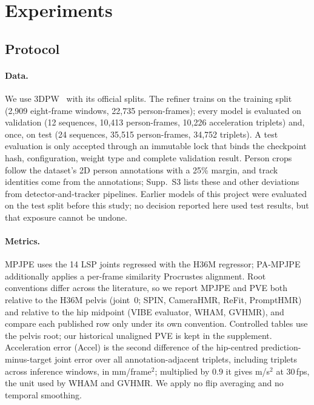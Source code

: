\section{Experiments}
\label{sec:experiments}

\subsection{Protocol}
\label{sec:protocol}

\paragraph{Data.}
We use 3DPW~\cite{vonmarcard2018pw3d} with its official splits.
The refiner trains on the training split (2,909 eight-frame windows, 22,735 person-frames); every model is evaluated on validation (12 sequences, 10,413 person-frames, 10,226 acceleration triplets) and, once, on test (24 sequences, 35,515 person-frames, 34,752 triplets).
A test evaluation is only accepted through an immutable lock that binds the checkpoint hash, configuration, weight type and complete validation result.
Person crops follow the dataset's 2D person annotations with a 25\% margin, and track identities come from the annotations; Supp.~S3 lists these and other deviations from detector-and-tracker pipelines.
Earlier models of this project were evaluated on the test split before this study; no decision reported here used test results, but that exposure cannot be undone.

\paragraph{Metrics.}
MPJPE uses the 14 LSP joints regressed with the H36M regressor; PA-MPJPE additionally applies a per-frame similarity Procrustes alignment.
Root conventions differ across the literature, so we report MPJPE and PVE both relative to the H36M pelvis (joint~0; SPIN, CameraHMR, ReFit, PromptHMR) and relative to the hip midpoint (VIBE evaluator, WHAM, GVHMR), and compare each published row only under its own convention.
Controlled tables use the pelvis root; our historical unaligned PVE is kept in the supplement.
Acceleration error (Accel) is the second difference of the hip-centred prediction-minus-target joint error over all annotation-adjacent triplets, including triplets across inference windows, in mm/frame$^2$; multiplied by $0.9$ it gives m/s$^2$ at 30\,fps, the unit used by WHAM and GVHMR.
We apply no flip averaging and no temporal smoothing.

